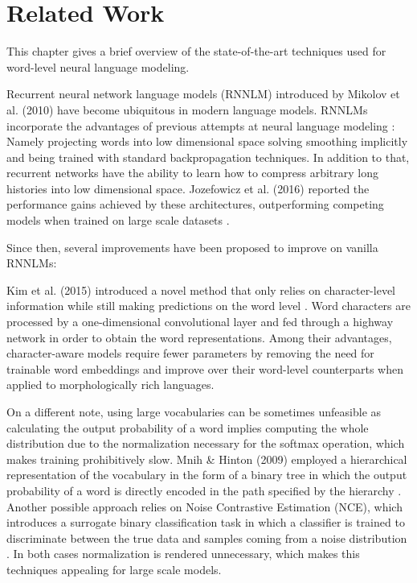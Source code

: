 \chapter{Related Work}

This chapter gives a brief overview of the state-of-the-art techniques used for word-level neural language modeling.

Recurrent neural network language models (RNNLM) \cite{mikolov2010recurrent} introduced by Mikolov et al. (2010) have become ubiquitous in modern language models. RNNLMs incorporate the advantages of previous attempts at neural language modeling \cite{bengio2003neural}: Namely projecting words into low dimensional space solving smoothing implicitly and being trained with standard backpropagation techniques. In addition to that, recurrent networks have the ability to learn how to compress arbitrary long histories into low dimensional space. Jozefowicz et al. (2016) reported the performance gains achieved by these architectures, outperforming competing models when trained on large scale datasets \cite{jozefowicz2016exploring}.

Since then, several improvements have been proposed to improve on vanilla RNNLMs:

Kim et al. (2015) introduced a novel method that only relies on character-level information while still making predictions on the word level \cite{kim2016character}. Word characters are processed by a one-dimensional convolutional layer and fed through a highway network in order to obtain the word representations. Among their advantages, character-aware models require fewer parameters by removing the need for trainable word embeddings and improve over their word-level counterparts when applied to morphologically rich languages.

On a different note, using large vocabularies can be sometimes unfeasible as calculating the output probability of a word implies computing the whole distribution due to the normalization necessary for the softmax operation, which makes training prohibitively slow. Mnih \& Hinton (2009) employed a hierarchical representation of the vocabulary in the form of a binary tree in which the output probability of a word is directly encoded in the path specified by the hierarchy \cite{mnih2009scalable}. Another possible approach relies on Noise Contrastive Estimation (NCE), which introduces a surrogate binary classification task in which a classifier is trained to discriminate between the true data and samples coming from a noise distribution \cite{mnih2012fast}. In both cases normalization is rendered unnecessary, which makes this techniques appealing for large scale models.

